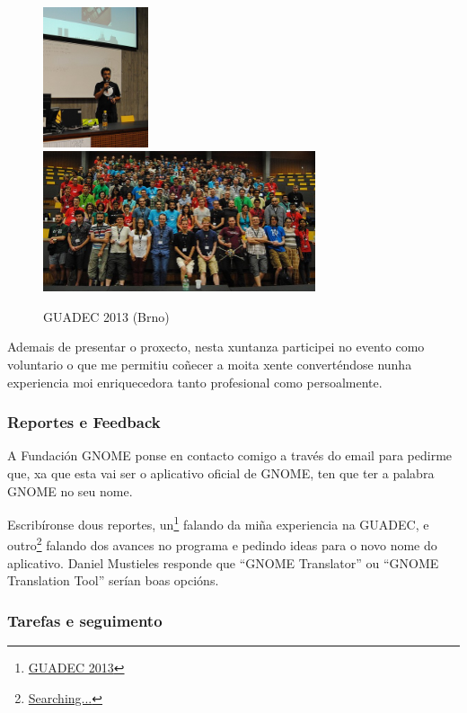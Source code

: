 \begin{figure}[h!]
    \centering
    \includegraphics[width=0.275\textwidth]{img/guadec_2013_1.jpg}
    \includegraphics[width=0.715\textwidth]{img/guadec_2013_2.jpg}
    \caption{GUADEC 2013 (Brno)}
    \label{fig:guadec2013}
\end{figure}

Ademais de presentar o proxecto, nesta xuntanza participei no evento como voluntario o que me permitiu coñecer a moita xente converténdose nunha experiencia moi enriquecedora tanto profesional como persoalmente.

\subsubsection{Reportes e Feedback}

A Fundación GNOME ponse en contacto comigo a través do email para pedirme que, xa que esta vai ser o aplicativo oficial de GNOME, ten que ter a palabra GNOME no seu nome.

Escribíronse dous reportes, un\footnote{\href{http://aquelando.info/guadec-2013/}{GUADEC 2013}} falando da miña experiencia na GUADEC, e outro\footnote{\href{http://aquelando.info/searching/}{Searching...}} falando dos avances no programa e pedindo ideas para o novo nome do aplicativo. Daniel Mustieles responde que ``GNOME Translator'' ou ``GNOME Translation Tool'' serían boas opcións.

\subsubsection{Tarefas e seguimento}

